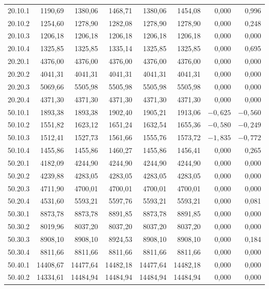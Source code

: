 \documentclass[../DoAn.tex]{subfiles}
\begin{document}
\begin{small}
\begin{longtable}{l|r|rr|rr|rr}
20.10.1 & 1190,69 & 1380,06 & 1468,71 & 1380,06 & 1454,08 & 0,000 & 0,996 \\
20.10.2 & 1254,60 & 1278,90 & 1282,08 & 1278,90 & 1278,90 & 0,000 & 0,248 \\
20.10.3 & 1206,18 & 1206,18 & 1206,18 & 1206,18 & 1206,18 & 0,000 & 0,000 \\
20.10.4 & 1325,85 & 1325,85 & 1335,14 & 1325,85 & 1325,85 & 0,000 & 0,695 \\
20.20.1 & 4376,00 & 4376,00 & 4376,00 & 4376,00 & 4376,00 & 0,000 & 0,000 \\
20.20.2 & 4041,31 & 4041,31 & 4041,31 & 4041,31 & 4041,31 & 0,000 & 0,000 \\
20.20.3 & 5069,66 & 5505,98 & 5505,98 & 5505,98 & 5505,98 & 0,000 & 0,000 \\
20.20.4 & 4371,30 & 4371,30 & 4371,30 & 4371,30 & 4371,30 & 0,000 & 0,000 \\
50.10.1 & 1893,38 & 1893,38 & 1902,40 & 1905,21 & 1913,06 & $-0{,}625$ & $-0{,}560$ \\
50.10.2 & 1551,82 & 1623,12 & 1651,24 & 1632,54 & 1655,36 & $-0{,}580$ & $-0{,}249$ \\
50.10.3 & 1512,41 & 1527,73 & 1561,66 & 1555,76 & 1573,72 & $-1{,}835$ & $-0{,}772$ \\
50.10.4 & 1455,86 & 1455,86 & 1460,27 & 1455,86 & 1456,41 & 0,000 & 0,265 \\
50.20.1 & 4182,09 & 4244,90 & 4244,90 & 4244,90 & 4244,90 & 0,000 & 0,000 \\
50.20.2 & 4239,88 & 4283,05 & 4283,05 & 4283,05 & 4283,05 & 0,000 & 0,000 \\
50.20.3 & 4711,90 & 4700,01 & 4700,01 & 4700,01 & 4700,01 & 0,000 & 0,000 \\
50.20.4 & 4531,60 & 5593,21 & 5597,76 & 5593,21 & 5593,21 & 0,000 & 0,081 \\
50.30.1 & 8873,78 & 8873,78 & 8891,85 & 8873,78 & 8891,85 & 0,000 & 0,000 \\
50.30.2 & 8019,96 & 8037,20 & 8037,20 & 8037,20 & 8037,20 & 0,000 & 0,000 \\
50.30.3 & 8908,10 & 8908,10 & 8924,53 & 8908,10 & 8908,10 & 0,000 & 0,184 \\
50.30.4 & 8811,66 & 8811,66 & 8811,66 & 8811,66 & 8811,66 & 0,000 & 0,000 \\
50.40.1 & 14408,67 & 14477,64 & 14482,18 & 14477,64 & 14482,18 & 0,000 & 0,000 \\
50.40.2 & 14334,61 & 14484,94 & 14484,94 & 14484,94 & 14484,94 & 0,000 & 0,000 \\

\end{longtable}
\end{small}
\end{document}
